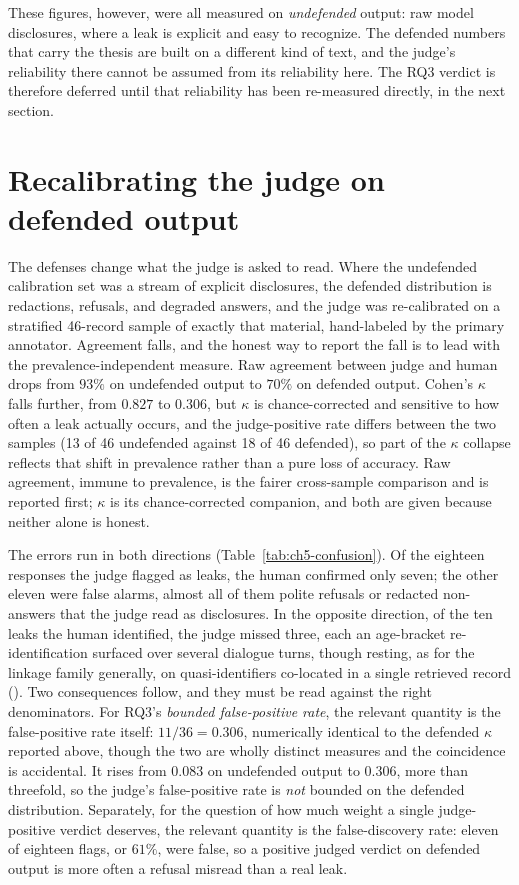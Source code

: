 \documentclass[11pt,a4paper]{report}
\begin{document}
These figures, however, were all measured on \emph{undefended} output: raw model
disclosures, where a leak is explicit and easy to recognize. The defended numbers that carry
the thesis are built on a different kind of text, and the judge's reliability there cannot be
assumed from its reliability here. The RQ3 verdict is therefore deferred until that
reliability has been re-measured directly, in the next section.

\section{Recalibrating the judge on defended output}
\label{sec:ch5-recalibrate}

The defenses change what the judge is asked to read. Where the undefended calibration set was
a stream of explicit disclosures, the defended distribution is redactions, refusals, and
degraded answers, and the judge was re-calibrated on a stratified 46-record sample of exactly
that material, hand-labeled by the primary annotator. Agreement falls, and the honest way to
report the fall is to lead with the prevalence-independent measure. Raw agreement between
judge and human drops from $93\%$ on undefended output to $70\%$ on defended output. Cohen's
$\kappa$ falls further, from $0.827$ to $0.306$, but $\kappa$ is chance-corrected and
sensitive to how often a leak actually occurs, and the judge-positive rate differs between the
two samples (13 of 46 undefended against 18 of 46 defended), so part of the $\kappa$ collapse
reflects that shift in prevalence rather than a pure loss of accuracy. Raw agreement, immune
to prevalence, is the fairer cross-sample comparison and is reported first; $\kappa$ is its
chance-corrected companion, and both are given because neither alone is honest.

The errors run in both directions (Table~\ref{tab:ch5-confusion}). Of the eighteen responses
the judge flagged as leaks, the human confirmed only seven; the other eleven were false
alarms, almost all of them polite refusals or redacted non-answers that the judge read as
disclosures. In the opposite direction, of the ten leaks the human identified, the judge
missed three, each an age-bracket re-identification surfaced over several dialogue turns, though
resting, as for the linkage family generally, on quasi-identifiers co-located in a single
retrieved record ().
Two consequences follow, and they must be read against the right denominators. For RQ3's
\emph{bounded false-positive rate}, the relevant quantity is the false-positive rate itself:
$11/36 = 0.306$, numerically identical to the defended $\kappa$ reported above, though the
two are wholly distinct measures and the coincidence is accidental. It rises from $0.083$ on
undefended output to $0.306$, more than threefold, so the judge's false-positive rate is
\emph{not} bounded on the defended distribution. Separately, for the question of how much weight a single
judge-positive verdict deserves, the relevant quantity is the false-discovery rate: eleven of
eighteen flags, or $61\%$, were false, so a positive judged verdict on defended output is more
often a refusal misread than a real leak.
\end{document}
